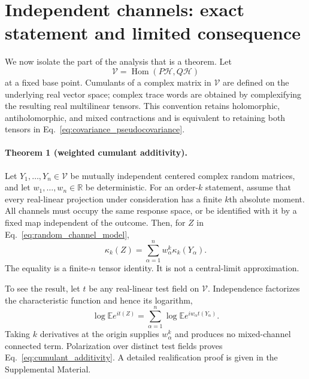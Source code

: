 \section{Independent channels: exact statement and limited consequence}
\label{sec:channel_theorem}
\label{sec:channel-theorem}

We now isolate the part of the analysis that is a theorem.  Let
\begin{equation}
 \mathcal V=\operatorname{Hom}(P\mathcal H,Q\mathcal H)
 \label{eq:response_space}
\end{equation}
at a fixed base point.  Cumulants of a complex matrix in $\mathcal V$ are
defined on the underlying real vector space; complex trace words are obtained
by complexifying the resulting real multilinear tensors.  This convention
retains holomorphic, antiholomorphic, and mixed contractions and is
equivalent to retaining both tensors in
Eq.~\eqref{eq:covariance_pseudocovariance}.

\paragraph{Theorem 1 (weighted cumulant additivity).}
Let $Y_1,\ldots,Y_n\in\mathcal V$ be mutually independent centered complex
random matrices, and let $w_1,\ldots,w_n\in\mathbb R$ be deterministic.  For
an order-$k$ statement, assume that every real-linear projection under
consideration has a finite $k$th absolute moment.  All channels must occupy
the same response space, or be identified with it by a fixed map independent
of the outcome.  Then, for $Z$ in
Eq.~\eqref{eq:random_channel_model},
\begin{equation}
 \boxed{
 \kappa_k(Z)=\sum_{\alpha=1}^{n}
 w_\alpha^k\kappa_k(Y_\alpha)} .
 \label{eq:cumulant_additivity}
\end{equation}
The equality is a finite-$n$ tensor identity.  It is not a central-limit
approximation.

To see the result, let $t$ be any real-linear test field on $\mathcal V$.
Independence factorizes the characteristic function and hence its logarithm,
\begin{equation}
 \log\mathbb E e^{it(Z)}
 =\sum_{\alpha=1}^{n}
 \log\mathbb E e^{iw_\alpha t(Y_\alpha)} .
 \label{eq:log_characteristic_additivity}
\end{equation}
Taking $k$ derivatives at the origin supplies $w_\alpha^k$ and produces no
mixed-channel connected term.  Polarization over distinct test fields proves
Eq.~\eqref{eq:cumulant_additivity}.  A detailed realification proof is given
in the Supplemental Material.

